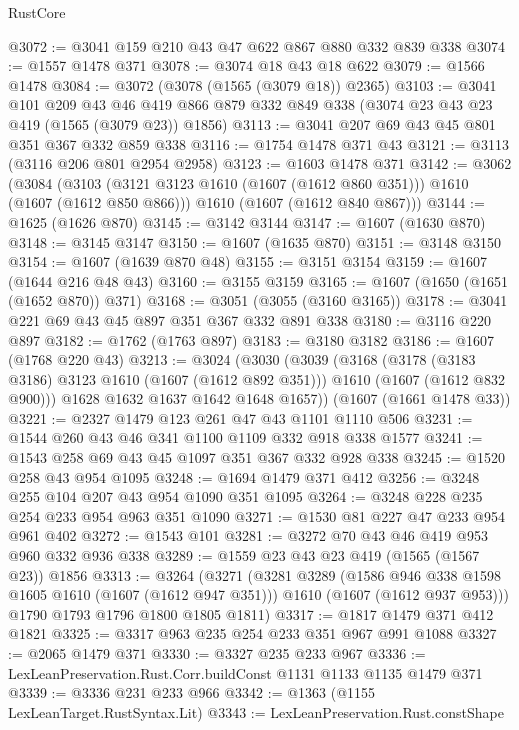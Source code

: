 \begin{lexlean}{RustCore}
\begin{coremodule}
@3072 := @3041 @159 @210 @43 @47 @622 @867 @880 @332 @839 @338
@3074 := @1557 @1478 @371
@3078 := @3074 @18 @43 @18 @622
@3079 := @1566 @1478
@3084 := @3072 (@3078 (@1565 (@3079 @18)) @2365)
@3103 := @3041
    @101
    @209
    @43
    @46
    @419
    @866
    @879
    @332
    @849
    @338
    (@3074 @23 @43 @23 @419 (@1565 (@3079 @23)) @1856)
@3113 := @3041 @207 @69 @43 @45 @801 @351 @367 @332 @859 @338
@3116 := @1754 @1478 @371 @43
@3121 := @3113 (@3116 @206 @801 @2954 @2958)
@3123 := @1603 @1478 @371
@3142 := @3062
    (@3084
      (@3103 (@3121 @3123 @1610 (@1607 (@1612 @860 @351))) @1610 (@1607 (@1612 @850 @866)))
      @1610
      (@1607 (@1612 @840 @867)))
@3144 := @1625 (@1626 @870)
@3145 := @3142 @3144
@3147 := @1607 (@1630 @870)
@3148 := @3145 @3147
@3150 := @1607 (@1635 @870)
@3151 := @3148 @3150
@3154 := @1607 (@1639 @870 @48)
@3155 := @3151 @3154
@3159 := @1607 (@1644 @216 @48 @43)
@3160 := @3155 @3159
@3165 := @1607 (@1650 (@1651 (@1652 @870)) @371)
@3168 := @3051 (@3055 (@3160 @3165))
@3178 := @3041 @221 @69 @43 @45 @897 @351 @367 @332 @891 @338
@3180 := @3116 @220 @897
@3182 := @1762 (@1763 @897)
@3183 := @3180 @3182
@3186 := @1607 (@1768 @220 @43)
@3213 := @3024
    (@3030
      (@3039
        (@3168
          (@3178 (@3183 @3186) @3123 @1610 (@1607 (@1612 @892 @351)))
          @1610
          (@1607 (@1612 @832 @900)))
        @1628
        @1632
        @1637
        @1642
        @1648
        @1657))
    (@1607 (@1661 @1478 @33))
@3221 := @2327 @1479 @123 @261 @47 @43 @1101 @1110 @506
@3231 := @1544 @260 @43 @46 @341 @1100 @1109 @332 @918 @338 @1577
@3241 := @1543 @258 @69 @43 @45 @1097 @351 @367 @332 @928 @338
@3245 := @1520 @258 @43 @954 @1095
@3248 := @1694 @1479 @371 @412
@3256 := @3248 @255 @104 @207 @43 @954 @1090 @351 @1095
@3264 := @3248 @228 @235 @254 @233 @954 @963 @351 @1090
@3271 := @1530 @81 @227 @47 @233 @954 @961 @402
@3272 := @1543 @101
@3281 := @3272 @70 @43 @46 @419 @953 @960 @332 @936 @338
@3289 := @1559 @23 @43 @23 @419 (@1565 (@1567 @23)) @1856
@3313 := @3264
    (@3271
      (@3281
        @3289
        (@1586 @946 @338 @1598 @1605 @1610 (@1607 (@1612 @947 @351)))
        @1610
        (@1607 (@1612 @937 @953)))
      @1790
      @1793
      @1796
      @1800
      @1805
      @1811)
@3317 := @1817 @1479 @371 @412 @1821
@3325 := @3317 @963 @235 @254 @233 @351 @967 @991 @1088
@3327 := @2065 @1479 @371
@3330 := @3327 @235 @233 @967
@3336 := LexLeanPreservation.Rust.Corr.buildConst @1131 @1133 @1135 @1479 @371
@3339 := @3336 @231 @233 @966
@3342 := @1363 (@1155 LexLeanTarget.RustSyntax.Lit)
@3343 := LexLeanPreservation.Rust.constShape

\end{coremodule}
\end{lexlean}
